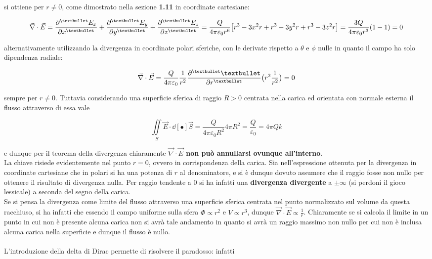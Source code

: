 si ottiene per $r \neq 0$, come dimostrato nella sezione \textbf{1.11} in coordinate cartesiane:

\[\vec{\nabla} \cdot \vec{E} = \pdv[•]{E_x}{x} + \pdv[•]{E_y}{y} + \pdv[•]{E_z}{z} = \frac{Q}{4 \pi \varepsilon_0 r^6} \big[r^3 - 3x^2 r + r^3 - 3y^2 r + r^3 - 3z^2 r\big] = \frac{3 Q}{4 \pi \varepsilon_0 r^3} (1-1) = 0\]

alternativamente utilizzando la divergenza in coordinate polari sferiche, con le derivate rispetto a $\theta$ e $\phi$ nulle in quanto il campo ha solo dipendenza radiale:

\[\vec{\nabla} \cdot \vec{E} = \frac{Q}{4 \pi \varepsilon_0}\frac{1}{r^2} \pdv[•]{•}{r} \big(r^2 \frac{1}{r^2}\big) = 0\]

sempre per $r \neq 0$. Tuttavia considerando una superficie sferica di raggio $R > 0$ centrata nella carica ed orientata con normale esterna il flusso attraverso di essa vale

\[\iint\limits_{S} \vec{E} \cdot \dd[•]{\vec{S}} = \frac{Q}{4 \pi \varepsilon_0 R^2} 4 \pi R^2 = \frac{Q}{\varepsilon_0} = 4 \pi Q k\]

e dunque per il teorema della divergenza chiaramente \textbf{$\vec{\nabla} \cdot \vec{E}$ non può annullarsi ovunque all'interno}.
\\La chiave risiede evidentemente nel punto $r = 0$, ovvero in corrispondenza della carica. Sia nell'espressione ottenuta per la divergenza in coordinate cartesiane che in polari si ha una potenza di $r$ al denominatore, e si è dunque dovuto assumere che il raggio fosse non nullo per ottenere il risultato di divergenza nulla. Per raggio tendente a $0$ si ha infatti una \textbf{divergenza divergente} a $\pm\infty$ (si perdoni il gioco lessicale) a seconda del segno della carica. 
\\Se si pensa la divergenza come limite del flusso attraverso una superficie sferica centrata nel punto normalizzato sul volume da questa racchiuso, si ha infatti che essendo il campo uniforme sulla sfera $\Phi \propto r^2$ e $V \propto r^3$, dunque $\vec{\nabla} \cdot \vec{E} \propto \frac{1}{r}$. Chiaramente se si calcola il limite in un punto in cui non è presente alcuna carica non si avrà tale andamento in quanto si avrà un raggio massimo non nullo per cui non è inclusa alcuna carica nella superficie e dunque il flusso è nullo.
\\~\\L'introduzione della delta di Dirac permette di risolvere il paradosso: infatti

